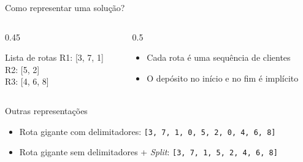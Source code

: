 \documentclass[aspectratio=169,xcolor=table]{beamer}
\begin{document}
\begin{frame}{Como representar uma solução?}
  \begin{columns}[c]
    \begin{column}{0.45\textwidth}
      \begin{block}{Lista de rotas}
        \centering
        \ttfamily
        R1: [3, 7, 1]\\
        R2: [5, 2]\\
        R3: [4, 6, 8]
      \end{block}
    \end{column}
    \begin{column}{0.5\textwidth}
      \begin{itemize}
        \item Cada rota é uma sequência de clientes
        \item O depósito no início e no fim é implícito
      \end{itemize}
    \end{column}
  \end{columns}
  \vspace{1em}
  \begin{block}{Outras representações}
    \small
    \begin{itemize}
      \item Rota gigante com delimitadores: \texttt{[3, 7, 1, 0, 5, 2, 0, 4, 6, 8]} \cite{alinaghian2018multi}
      \item Rota gigante sem delimitadores + \emph{Split}: \texttt{[3, 7, 1, 5, 2, 4, 6, 8]} \cite{beasley1983route,prins2004split}
    \end{itemize}
  \end{block}
\end{frame}
\end{document}
